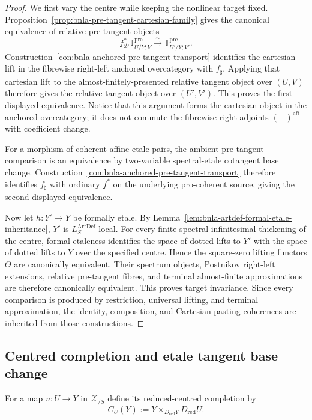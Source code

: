 \begin{proof}
We first vary the centre while keeping the nonlinear target fixed.
Proposition~\ref{prop:bnla-pre-tangent-cartesian-family} gives the canonical
equivalence of relative pre-tangent objects
\[
    f_{\mathcal D}^*
    \mathbb T^{\mathrm{pre}}_{U/Y;V}
    \xrightarrow{\sim}
    \mathbb T^{\mathrm{pre}}_{U'/Y;V'}.
\]
Construction~\ref{con:bnla-anchored-pre-tangent-transport} identifies the
cartesian lift in the fibrewise right-left anchored overcategory with
$f_\sharp$.  Applying that cartesian lift to the almost-finitely-presented
relative tangent object over $(U,V)$ therefore gives the relative tangent
object over $(U',V')$.  This proves the first displayed equivalence.  Notice
that this argument forms the cartesian object in the anchored overcategory;
it does not commute the fibrewise right adjoints
$(-)^{\mathrm{aft}}$ with coefficient change.

For a morphism of coherent affine-etale pairs, the ambient pre-tangent
comparison is an equivalence by two-variable spectral-etale cotangent base
change.  Construction~\ref{con:bnla-anchored-pre-tangent-transport} therefore
identifies $f_\sharp$ with ordinary $f^*$ on the underlying pro-coherent
source, giving the second displayed equivalence.

Now let $h:Y'\to Y$ be formally etale.  By
Lemma~\ref{lem:bnla-artdef-formal-etale-inheritance}, $Y'$ is
$L^{\mathrm{ArtDef}}_S$-local.  For every finite spectral infinitesimal
thickening of the centre, formal etaleness identifies the space of dotted
lifts to $Y'$ with the space of dotted lifts to $Y$ over the specified
centre.  Hence the square-zero lifting functors $\Theta$ are canonically
equivalent.  Their spectrum objects, Postnikov right-left
extensions, relative pre-tangent fibres, and terminal almost-finite
approximations are therefore canonically equivalent.  This proves target
invariance.  Since every comparison is produced by restriction, universal
lifting, and terminal approximation, the identity, composition, and
Cartesian-pasting coherences are inherited from those constructions.
\end{proof}

\subsection{Centred completion and etale tangent base change}

For a map $u:U\to Y$ in $\mathcal X_{/S}$ define its reduced-centred
completion by
\[
\boxed{
    C_U(Y)
    :=
    Y\times_{D_{\mathrm{red}}Y}D_{\mathrm{red}}U.}
\]

